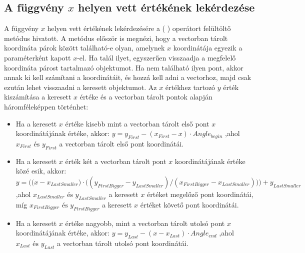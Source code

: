 \subsection{A függvény $x$ helyen vett értékének lekérdezése} \label{getValue}
A függvény $x$ helyen vett értékének lekérdezésére a ( ) operátort felültöltő metódus hivatott.
A metódus először is megnézi, hogy a vectorban tárolt koordináta párok között található-e olyan, amelynek $x$ koordinátája egyezik a paraméterként kapott $x$-el.
Ha talál ilyet, egyszerűen visszaadja a megfelelő koordináta párost tartalmazó  objektumot.
Ha nem található ilyen pont, akkor annak ki kell számítani a koordinátáit, és hozzá kell adni a vectorhoz, majd csak ezután lehet visszaadni a keresett  objektumot.
Az $x$ értékhez tartozó $y$ érték kiszámítása a keresett $x$ értéke és a vectorban tárolt pontok alapján háromféleképpen történhet:
\begin{itemize}
\item Ha a keresett $x$ értéke kisebb mint a vectorban tárolt első pont $x$ koordinátájának értéke, akkor: 
$y=y_{First}-(x_{First}-x) \cdot Angle_{begin}$ ,ahol $x_{First} \text{ és } y_{First}$ a vectorban tárolt első pont koordinátái.
\item Ha a keresett $x$ érték két a vectorban tárolt pont $x$ koordinátájának értéke közé esik, akkor:
$y=\bigg(\big(x-x_{LastSmaller}\big) \cdot \big((y_{FirstBigger}-y_{LastSmaller})/(x_{FirstBigger}-x_{LastSmaller})\big)\bigg)+y_{LastSmaller}$ ,ahol $x_{LastSmaller} \text{ és } y_{LastSmaller}$ a keresett $x$ értéket megelőző pont koordinátái, míg $x_{FirstBigger} \text{ és } y_{FirstBigger}$ a keresett $x$ értéket követő pont koordinátái. 
\item Ha a keresett $x$ értéke nagyobb, mint a vectorban tárolt utolsó pont $x$ koordinátájának értéke, akkor:
$y=y_{Last}-(x-x_{Last}) \cdot Angle_{end}$ ,ahol $x_{Last} \text{ és } y_{Last}$ a vectorban tárolt utolsó pont koordinátái.
\end{itemize}
